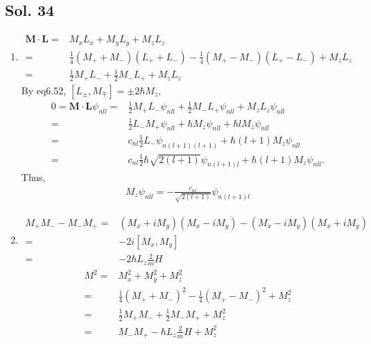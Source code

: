 \subsection*{Sol. 34}
\begin{enumerate}
    \item 
    \begin{align*}
        \bm M\cdot \bm L=&
        M_xL_x+M_yL_y+M_zL_z\\
        =&
        \frac{1}{4}(M_++M_-)(L_++L_-)
        -\frac{1}{4}(M_+-M_-)(L_+-L_-)
        +M_zL_z\\
        =&
        \frac{1}{2}M_+L_-
        +\frac{1}{2}M_-L_+
        +M_zL_z
    \end{align*}
    By eq6.52, $[L_\pm,M_\mp]=\pm2\hbar M_z,$
    \begin{align*}
        0=\bm M\cdot \bm L\psi_{nll}
        =&
        \frac{1}{2}M_+L_-\psi_{nll}
        +\frac{1}{2}M_-L_+\psi_{nll}
        +M_zL_z\psi_{nll}\\
        =&
        \frac{1}{2}L_-M_+\psi_{nll}
        +\hbar M_z\psi_{nll}
        +
        \hbar lM_z\psi_{nll}\\
        =&
        c_{nl}\frac{1}{2}L_-\psi_{n(l+1)(l+1)}
        +
        \hbar (l+1)M_z\psi_{nll}\\
        =&
        c_{nl}\frac{1}{2}\hbar\sqrt{2(l+1)}\psi_{n(l+1)l}
        +
        \hbar (l+1)M_z\psi_{nll}.
    \end{align*}
    Thus,
    \begin{align*}
        M_z\psi_{nll}=-\frac{c_{nl}}{\sqrt{2(l+1)}}\psi_{n(l+1)l}
    \end{align*}
    \item 
    \begin{align*}
        M_+M_--M_-M_+
        =&(M_x+iM_y)(M_x-iM_y)-(M_x-iM_y)(M_x+iM_y)\\
        =&-2i[M_x,M_y]\\
        =&-2\hbar L_z\frac{2}{m}H
    \end{align*}
    \begin{align*}
        M^2=&M_x^2+M_y^2+M_z^2 \\
        =& \frac{1}{4}(M_++M_-)^2
        -\frac{1}{4}(M_+-M_-)^2
        +M_z^2\\
        =&\frac{1}{2}
        M_+M_-
        +\frac{1}{2}
        M_-M_+ + M_z^2\\
        =&M_-M_+-\hbar L_z\frac{2}{m}H+M_z^2
    \end{align*}
    

\end{enumerate}
